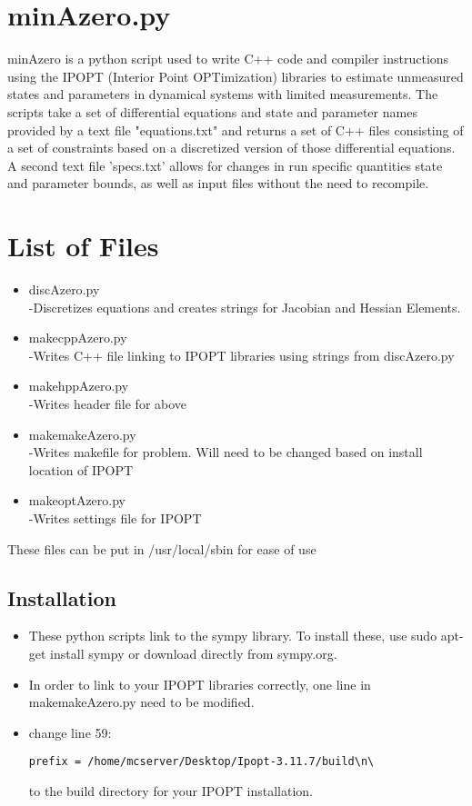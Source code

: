 \documentclass{scrartcl}
\newcommand{\bi}{\begin{itemize}}
\newcommand{\ei}{\end{itemize}}
\begin{document}
\pagebreak
\section*{minAzero.py}
minAzero is a python script used to write C++ code and compiler instructions using the IPOPT (Interior Point OPTimization) libraries to estimate unmeasured states and parameters in dynamical systems with limited measurements.  The scripts take a set of differential equations and state and parameter names provided by a text file "equations.txt" and returns a set of C++ files consisting of a set of constraints based on a discretized version of those differential equations.  A second text file 'specs.txt' allows for changes in run specific quantities state and parameter bounds, as well as input files without the need to recompile.


\section*{List of Files}
\bi
\item discAzero.py\\
	-Discretizes equations and creates strings for Jacobian and Hessian Elements.
\item makecppAzero.py\\
	-Writes C++ file linking to IPOPT libraries using strings from discAzero.py
\item makehppAzero.py\\
	-Writes header file for above
\item makemakeAzero.py\\
	-Writes makefile for problem.  Will need to be changed based on install location of IPOPT
\item makeoptAzero.py\\
	-Writes settings file for IPOPT
\ei

These files can be put in /usr/local/sbin for ease of use
\subsection*{Installation}
\bi
\item These python scripts link to the sympy library.  To install these, use sudo apt-get install sympy or download directly from sympy.org.
\item In order to link to your IPOPT libraries correctly, one line in makemakeAzero.py need to be modified.
\item change line 59:
\begin{verbatim}
prefix = /home/mcserver/Desktop/Ipopt-3.11.7/build\n\
\end{verbatim}
to the build directory for your IPOPT installation.
\ei
\end{document}
